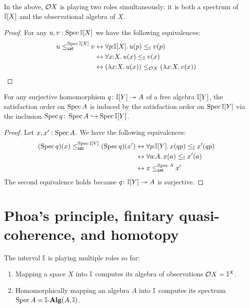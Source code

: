 In the above, $\mathcal{O}{X}$ is playing two roles simultaneously: it is both a spectrum of $\mathbb{I}[X]$ and the observational algebra of $X$.

\begin{proof}
  For any $u,v:\operatorname{Spec}{\mathbb{I}[X]}$ we have the following equivalences:
  \begin{align*}
    u \satle[\spec{\I[X]}] v
    &\eq \fa{p}{\I[X]} u(p) \le_{\I} v(p)
    \\ 
    &\eq \fa{x}{X} u(x) \le_{\I} v(x)
    \\ 
    &\eq (\ld{x}{X}u(x)) \le_{\opens{X}} (\ld{x}{X}v(x))
    \qedhere
  \end{align*}
\end{proof}


\begin{lemma}\label{lem:cancoincide}
  For any surjective homomorphism $q \colon \mathbb{I}[Y] \twoheadrightarrow A$ of a free algebra $\mathbb{I}[Y]$, the satisfaction order on $\operatorname{Spec} A$ is induced by the satisfaction order on $\operatorname{Spec}{\mathbb{I}[Y]}$ via the inclusion ${\operatorname{Spec}{q}}\colon\operatorname{Spec}{A}\hookrightarrow \operatorname{Spec}{\mathbb{I}[Y]}$.
\end{lemma} 

\begin{proof}
  Let $x,x' : \operatorname{Spec} A$. We have the following equivalences:
  \begin{align*}
    (\spec{q})(x)\satle[\spec{\I[Y]}] (\spec{q})(x')
    &\eq 
    \fa{p}{\I[Y]}
    x(qp) \le_\I x'(qp)
    \\ 
    &\eq 
    \fa{a}{A} x(a) \le_\I x'(a) 
    \\ 
    &\eq 
    x\satle[\spec{A}] x'
  \end{align*}
% 
  The second equivalence holds because $q\colon \mathbb{I}[Y]\twoheadrightarrow A$ is surjective.
\end{proof}



\section{Phoa's principle, finitary quasi-coherence, and homotopy}

The interval $\mathbb{I}$ is playing multiple roles so far:
\begin{enumerate}
  \item Mapping a space $X$ into $\mathbb{I}$ computes its algebra of observations $\mathcal{O}{X} = \mathbb{I}^X$.
  \item Homomorphically mapping an algebra $A$ into $\mathbb{I}$ computes its spectrum $\spec{A} = \I\alg(A,\I)$.
\end{enumerate}

